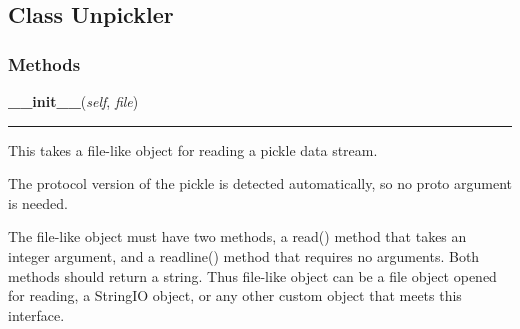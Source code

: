 

\subsection{Class Unpickler}

    \label{pickle:Unpickler}


  \subsubsection{Methods}

    \label{pickle:Unpickler:__init__}

    \vspace{0.5ex}

\hspace{.8\funcindent}\begin{boxedminipage}{\funcwidth}

    \raggedright \textbf{\_\_init\_\_}(\textit{self}, \textit{file})

    \vspace{-1.5ex}

    \rule{\textwidth}{0.5\fboxrule}
\setlength{\parskip}{2ex}
    This takes a file-like object for reading a pickle data stream.

    The protocol version of the pickle is detected automatically, so no 
    proto argument is needed.

    The file-like object must have two methods, a read() method that takes 
    an integer argument, and a readline() method that requires no 
    arguments.  Both methods should return a string.  Thus file-like object
    can be a file object opened for reading, a StringIO object, or any 
    other custom object that meets this interface.

\setlength{\parskip}{1ex}
    \end{boxedminipage}

